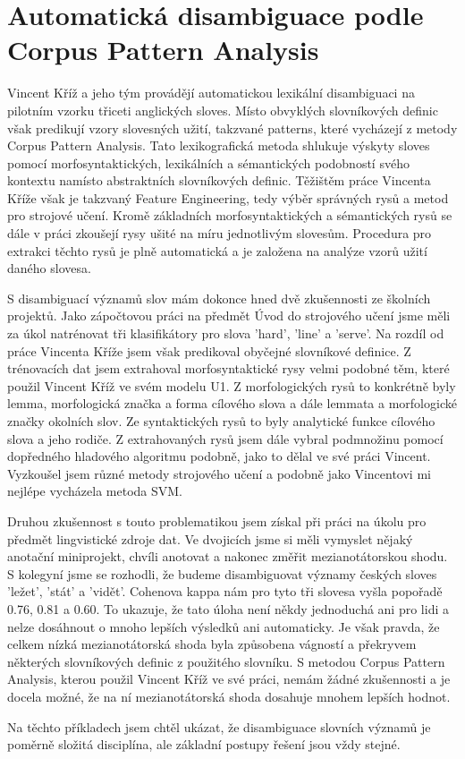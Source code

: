 \documentclass[12pt,a4paper]{report}
\begin{document}
\section*{Automatická disambiguace podle Corpus Pattern Analysis}

Vincent Kříž a jeho tým provádějí automatickou lexikální disambiguaci na
pilotním vzorku třiceti anglických sloves. Místo obvyklých slovníkových definic
však predikují vzory slovesných užití, takzvané patterns, které vycházejí z
metody Corpus Pattern Analysis. Tato lexikografická metoda shlukuje výskyty
sloves pomocí morfosyntaktických, lexikálních a sémantických podobností svého
kontextu namísto abstraktních slovníkových definic. Těžištěm práce Vincenta
Kříže však je takzvaný Feature Engineering, tedy výběr správných rysů a metod
pro strojové učení. Kromě základních morfosyntaktických a sémantických rysů se
dále v práci zkoušejí rysy ušité na míru jednotlivým slovesům.  Procedura pro
extrakci těchto rysů je plně automatická a je založena na analýze vzorů užití
daného slovesa.

S disambiguací významů slov mám dokonce hned dvě zkušennosti ze školních
projektů.  Jako zápočtovou práci na předmět Úvod do strojového učení jsme měli
za úkol natrénovat tři klasifikátory pro slova 'hard', 'line' a 'serve'. Na
rozdíl od práce Vincenta Kříže jsem však predikoval obyčejné slovníkové
definice.  Z trénovacích dat jsem extrahoval morfosyntaktické rysy velmi
podobné těm, které použil Vincent Kříž ve svém modelu U1. Z morfologických rysů
to konkrétně byly lemma, morfologická značka a forma cílového slova a dále
lemmata a morfologické značky okolních slov.  Ze syntaktických rysů to byly
analytické funkce cílového slova a jeho rodiče. Z extrahovaných rysů jsem dále
vybral podmnožinu pomocí dopředného hladového algoritmu podobně, jako to dělal
ve své práci Vincent. Vyzkoušel jsem různé metody strojového učení a podobně
jako Vincentovi mi nejlépe vycházela metoda SVM.

Druhou zkušennost s touto problematikou jsem získal při práci na úkolu pro
předmět lingvistické zdroje dat. Ve dvojicích jsme si měli vymyslet nějaký
anotační miniprojekt, chvíli anotovat a nakonec změřit mezianotátorskou shodu.
S kolegyní jsme se rozhodli, že budeme disambiguovat významy českých sloves
'ležet', 'stát' a 'vidět'. Cohenova kappa nám pro tyto tři slovesa vyšla
popořadě 0.76, 0.81 a 0.60.  To ukazuje, že tato úloha není někdy jednoduchá
ani pro lidi a nelze dosáhnout o mnoho lepších výsledků ani automaticky. Je
však pravda, že celkem nízká mezianotátorská shoda byla způsobena vágností a
překryvem některých slovníkových definic z použitého slovníku. S metodou Corpus
Pattern Analysis, kterou použil Vincent Kříž ve své práci, nemám žádné
zkušennosti a je docela možné, že na ní mezianotátorská shoda dosahuje mnohem
lepších hodnot.

Na těchto příkladech jsem chtěl ukázat, že disambiguace slovních významů je
poměrně složitá disciplína, ale základní postupy řešení jsou vždy stejné.
\end{document}

